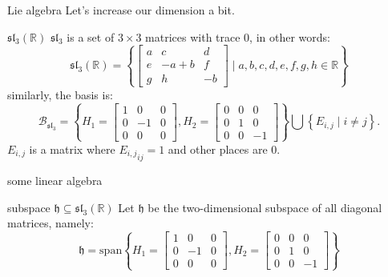 \documentclass{beamer}
\newcommand{\R}{\mathbb{R}}
\newcounter{mytheorem}[section] \def\themytheorem{\thesection.\arabic{mytheorem}}
\begin{document}
\addtocounter{mytheorem}{-1}
\begin{frame}{Lie algebra}
Let's increase our dimension a bit.

\begin{exm}{$\mathfrak{sl}_3(\R)$}{}
	$\mathfrak{sl}_{3}$ is a set of $3 \times 3$ matrices with trace 0, in other words:  \[
		\mathfrak{sl}_{3}(\R) = \left\{ \begin{bmatrix} a & c & d \\
		e & -a+b & f \\ g & h & -b\end{bmatrix} \mid a,b,c,d,e,f,g,h \in \R \right\} 
	\] 
\tcblower
similarly, the basis is: \[
	\mathcal{B}_{\mathfrak{sl}_{3}} = \left\{ H_1 = \begin{bmatrix} 1 & 0 &0 \\ 0 & -1 & 0 \\ 0 &0 &0 \end{bmatrix}, H_2 = \begin{bmatrix} 0 &0 &0 \\ 0 &1&0 \\ 0&0&-1 \end{bmatrix}   \right\} \bigcup \left\{ E_{i,j} \mid i \neq j\right\}. 
\] $E_{i,j}$ is a matrix where ${E_{i,j}}_{ij} = 1$ and other places are $0$.
\end{exm}

\end{frame}


\begin{frame}{some linear algebra}
	\begin{defn}{subspace $\mathfrak{h} \subseteq \mathfrak{sl}_3(\R)$}{}
		Let  $\mathfrak{h}$ be the two-dimensional subspace of all diagonal matrices, namely:  \[
			\mathfrak{h} = \text{span}{\left\{ H_1 = \begin{bmatrix} 1 & 0 &0 \\ 0 & -1 & 0 \\ 0 &0 &0 \end{bmatrix}, H_2 = \begin{bmatrix} 0 &0 &0 \\ 0 &1&0 \\ 0&0&-1 \end{bmatrix}   \right\} }
		\] 
	\end{defn}
\end{frame}
\end{document}
